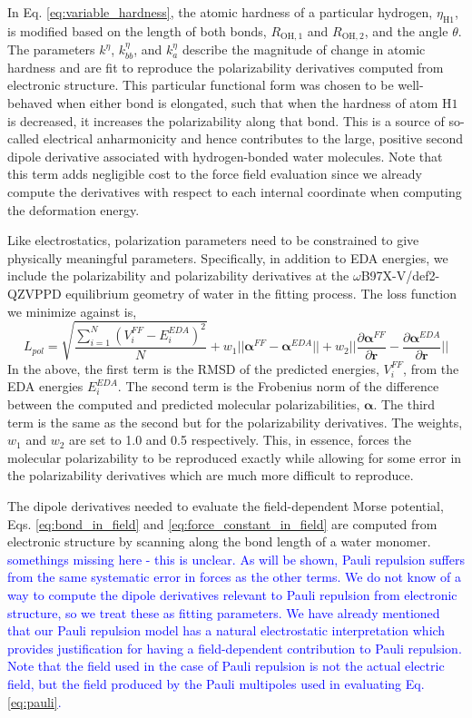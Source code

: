 \documentclass[journal=jctcce,manuscript=article]{achemso}
\begin{document}
In Eq. \ref{eq:variable_hardness}, the atomic hardness of a particular hydrogen, $\eta_{\mathrm{H1}}$, is modified based on the length of both  bonds, $R_{\mathrm{OH,1}}$ and $R_{\mathrm{OH,2}}$, and the angle $\theta$. The parameters $k^\eta$, $k^\eta_{bb}$, and $k^\eta_{a}$ describe the magnitude of change in atomic hardness and are fit to reproduce the polarizability derivatives computed from electronic structure. This particular functional form was chosen to be well-behaved when either bond is elongated, such that when the hardness of atom $\mathrm{H1}$ is decreased, it increases the polarizability along that bond. This is a source of so-called electrical anharmonicity and hence contributes to the large, positive second dipole derivative associated with hydrogen-bonded water molecules.\cite{mccoy2014role} Note that this term adds negligible cost to the force field evaluation since we already compute the derivatives with respect to each internal coordinate when computing the deformation energy.

Like electrostatics, polarization parameters need to be constrained to give physically meaningful parameters. Specifically, in addition to EDA energies, we include the polarizability and polarizability derivatives at the $\omega$B97X-V/def2-QZVPPD equilibrium geometry of water in the fitting process. The loss function we minimize against is,
\begin{equation}
  L_{pol}=\sqrt{\frac{\sum_{i=1}^{N}(V_i^{FF}-E_i^{EDA})^2}{N}} + w_1||\bm{\alpha}^{FF}-\bm{\alpha}^{EDA}||+w_2||\frac{\partial\bm{\alpha}^{FF}}{\partial \bm{r}}-\frac{\partial\bm{\alpha}^{EDA}}{\partial \bm{r}}||
\label{eq:pol_loss}
\end{equation}
\noindent
In the above, the first term is the RMSD of the predicted energies, $V_i^{FF}$, from the EDA energies $E_i^{EDA}$. The second term is the Frobenius norm of the difference between the computed and predicted molecular polarizabilities, $\bm{\alpha}$. The third term is the same as the second but for the polarizability derivatives. The weights, $w_1$ and $w_2$ are set to 1.0 and 0.5 respectively. This, in essence, forces the molecular polarizability to be reproduced exactly while allowing for some error in the polarizability derivatives which are much more difficult to reproduce.

The dipole derivatives needed to evaluate the field-dependent Morse potential, Eqs. \ref{eq:bond_in_field} and \ref{eq:force_constant_in_field} are computed from electronic structure by scanning along the  bond length of a water monomer. \textcolor{blue}{somethings missing here - this is unclear. As will be shown, Pauli repulsion suffers from the same systematic error in forces as the other terms. We do not know of a way to compute the dipole derivatives relevant to Pauli repulsion from electronic structure, so we treat these as fitting parameters. We have already mentioned that our Pauli repulsion model has a natural electrostatic interpretation which provides justification for having a field-dependent contribution to Pauli repulsion. Note that the field used in the case of Pauli repulsion is not the actual electric field, but the field produced by the Pauli multipoles used in evaluating Eq. \ref{eq:pauli}.}
\end{document}
